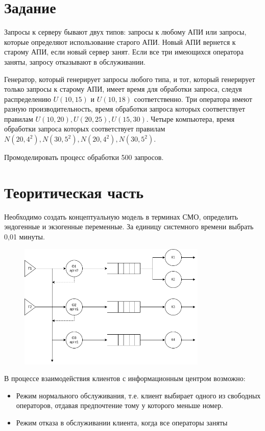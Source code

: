 \section{Задание}

Запросы к серверу бывают двух типов: запросы к любому АПИ или запросы, которые определяют использование старого АПИ. Новый АПИ вернется к старому АПИ, если новый сервер занят.
Если все три имеющихся оператора заняты, запросу отказывают в обслуживании.

Генератор, который генерирует запросы любого типа, и тот, который генерирует только запросы к старому АПИ, имеет время для обработки запроса, следуя распределению $U(10,15)$ и $U(10,18)$ соответственно.
Три оператора имеют разную производительность, время обработки запроса которых соответствует правилам $U(10,20), U(20,25), U(15,30)$.
Четыре компьютера, время обработки запроса которых соответствует правилам $N(20,4^2), N(30,5^2), N(20,4^2), N(30,5^2)$.

Промоделировать процесс обработки 500 запросов.

\section{Теоритическая часть}

Необходимо создать концептуальную модель в терминах СМО, определить эндогенные и экзогенные переменные.
За единицу системного времени выбрать 0,01 минуты.

\begin{figure}[h!]
\centering
\includegraphics[width=0.8\textwidth]{6/6_system}
\end{figure}


В процессе взаимодействия клиентов с информационным центром возможно:

\begin{itemize}
    \item Режим нормального обслуживания, т.е. клиент выбирает одного из свободных операторов, отдавая предпочтение тому у которого меньше номер.
    \item Режим отказа в обслуживании клиента, когда все операторы заняты
\end{itemize}

